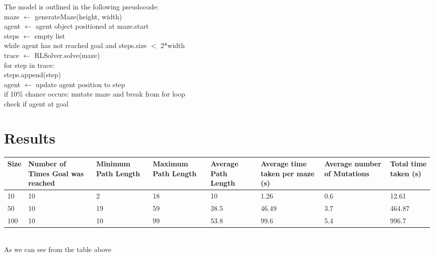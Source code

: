\documentclass{article}
\begin{document}
The model is outlined in the following pseudocode:\\
\hspace*{2cm}maze $\leftarrow$ generateMaze(height, width)\\
\hspace*{2cm}agent $\leftarrow$ agent object positioned at maze.start\\
\hspace*{2cm}steps $\leftarrow$ empty list\\
\hspace*{2cm}while agent has not reached goal and steps.size $<$ 2*width\\
\hspace*{3cm}trace $\leftarrow$ RLSolver.solve(maze)\\
\hspace*{3cm}for step in trace:\\
	\hspace*{4cm}steps.append(step)\\
	\hspace*{4cm}agent $\leftarrow$ update agent position to step\\
	\hspace*{4cm}if 10\% chance occurs: mutate maze and break from for loop\\
\hspace*{2cm}check if agent at goal


    \section{Results}\label{sec:results}

        \begin{tabular}{ | m{1cm} | m{5em}| m{2cm} | m{2cm} | m{2cm} | m{2cm} | m{2cm} | m{2cm} | } 
	\hline
	Size & Number of Times Goal was reached & Minimum Path Length & Maximum Path Length & Average Path Length & Average time taken
	per maze (s) & Average number of Mutations & Total time taken (s)\\
	  \hline
	  10 & 10 & 2 & 18 & 10 & 1.26 & 0.6 & 12.61 \\ 
	  \hline
	  50 & 10 & 19 & 59 & 38.5 & 46.49 & 3.7 & 464.87 \\ 
	  \hline
	  100 & 10 & 10 & 99 & 53.8 & 99.6 & 5.4 & 996.7 \\ 
	  \hline
	\end{tabular}
	\vspace*{1cm} \\
	As we can see from the table above

     

    
    
\end{document}
